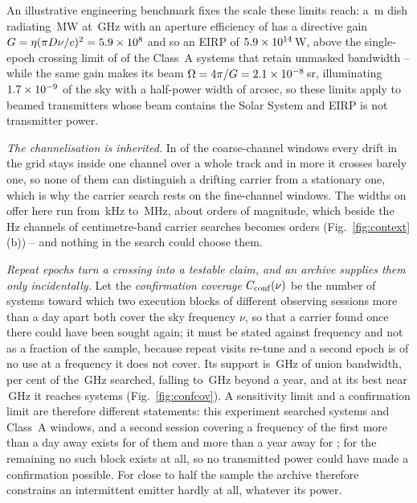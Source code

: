 An illustrative engineering benchmark fixes the scale these limits reach: a
\BenchDiam\,m dish radiating \BenchPowerMW\,MW at \BenchFreqGHz\,GHz with an
aperture efficiency of \BenchEta{} has a directive gain
$G=\eta(\pi D\nu/c)^{2}=5.9\times10^{8}$ and so an EIRP of $5.9\times10^{14}$\,W, above
the single-epoch crossing limit of \BenchNSysA{} of the \NSysALim{} Class~A
systems that retain unmasked bandwidth -- while the same gain makes its beam
$\Omega=4\pi/G=2.1\times10^{-8}$\,sr, illuminating $1.7\times10^{-9}$ of the sky with a
half-power width of \BmArcsec{} arcsec, so these limits apply to beamed
transmitters whose beam contains the Solar System and EIRP is not transmitter
power.

\emph{The channelisation is inherited.} In \ScCoarseNoDrift{} of the \NWinB{}
coarse-channel windows every drift in the grid stays inside one channel over a
whole track and in \EtaDriftBHi{} more it crosses barely one, so none of them
can distinguish a drifting carrier from a stationary one, which is why the
carrier search rests on the \NWinA{} fine-channel windows. The widths on offer
here run from \SzChanFinestKHz\,kHz to \SzChanWidestMHz\,MHz, about
\SzChanDexSurvey{} orders of magnitude, which beside the \SzChanLitHz\,Hz
channels of centimetre-band carrier searches becomes \SzChanDexAll{} orders
(Fig.~\ref{fig:context}(b)) -- and nothing in the search could choose them.

\emph{Repeat epochs turn a crossing into a testable claim, and an archive
supplies them only incidentally.} Let the \emph{confirmation coverage} $C_{\rm
conf}(\nu)$ be the number of systems toward which two execution blocks of
different observing sessions more than a day apart both cover the sky frequency
$\nu$, so that a carrier found once there could have been sought again; it must
be stated against frequency and not as a fraction of the sample, because repeat
visits re-tune and a second epoch is of no use at a frequency it does not
cover. Its support is \CvConfGHzDay\,GHz of union bandwidth, \CvConfPctDay{}
per cent of the \CvUnionA\,GHz searched, falling to \CvConfGHzYr\,GHz beyond a
year, and at its best near \CvConfNuMaxDay\,GHz it reaches \CvConfNMaxDay{}
systems (Fig.~\ref{fig:confcov}). A sensitivity limit and a confirmation limit
are therefore different statements: this experiment searched \RcSearchSys{}
systems and \RcSearchWin{} Class~A windows, and a second session covering a
frequency of the first more than a day away exists for \ZcConfSysDay{} of them
and more than a year away for \ZcConfSysYr; for the remaining \ZcNoRepSys{} no
such block exists at all, so no transmitted power could have made a
confirmation possible. For close to half the sample the archive therefore
constrains an intermittent emitter hardly at all, whatever its power.

